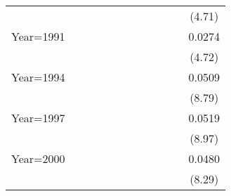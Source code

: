 \begin{table}[htbp]
\begin{tabular}{l*{11}{c}}
                    &                     &                     &                     &                     &                     &                     &                     &                     &                     &                     &      (4.71)         \\
[1em]
Year=1991           &                     &                     &                     &                     &                     &                     &                     &                     &                     &                     &      0.0274\sym{***}\\
                    &                     &                     &                     &                     &                     &                     &                     &                     &                     &                     &      (4.72)         \\
[1em]
Year=1994           &                     &                     &                     &                     &                     &                     &                     &                     &                     &                     &      0.0509\sym{***}\\
                    &                     &                     &                     &                     &                     &                     &                     &                     &                     &                     &      (8.79)         \\
[1em]
Year=1997           &                     &                     &                     &                     &                     &                     &                     &                     &                     &                     &      0.0519\sym{***}\\
                    &                     &                     &                     &                     &                     &                     &                     &                     &                     &                     &      (8.97)         \\
[1em]
Year=2000           &                     &                     &                     &                     &                     &                     &                     &                     &                     &                     &      0.0480\sym{***}\\
                    &                     &                     &                     &                     &                     &                     &                     &                     &                     &                     &      (8.29)         \\

\end{tabular}
\end{table}
